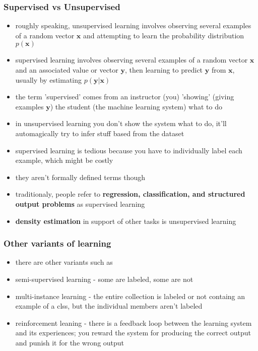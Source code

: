 \documentclass[11pt, twocolumn]{report}
\begin{document}
\subsubsection{Supervised vs Unsupervised}
\begin{itemize}
  \item roughly speaking, unsupervised learning involves observing several
    examples of a random vector $\bm{x}$ and attempting to learn the probability
    distribution $p(\bm{x})$
  \item supervised learning involves observing several examples of a random
    vector $\bm{x}$ and an associated value or vector $\bm{y}$, then learning
    to predict $\bm{y}$ from $\bm{x}$, usually by estimating $p(\bm{y} |
    \bm{x})$
  \item the term 'supervised' comes from an instructor (you) 'showing' (giving
    examples $\bm{y}$) the student (the machine learning system) what to do
  \item in unsupervised learning you don't show the system what to do, it'll
    automagically try to infer stuff based from the dataset
  \item supervised learning is tedious because you have to individually label
    each example, which might be costly
  \item they aren't formally defined terms though
  \item traditionaly, people refer to \textbf{regression, classification, and
      structured output problems} as supervised learning
  \item \textbf{density estimation} in support of other tasks is unsupervised
    learning
\end{itemize}

\subsubsection{Other variants of learning}
\begin{itemize}
  \item there are other variants such as
  \item semi-supervised learning - some are labeled, some are not
  \item multi-instance learning - the entire collection is labeled or not
    containg an example of a clss, but the individual members aren't labeled
  \item reinforcement leaning - there is a feedback loop between the learning
    system and its experiences; you reward the system for producing the correct
    output and punish it for the wrong output
\end{itemize}
\end{document}
